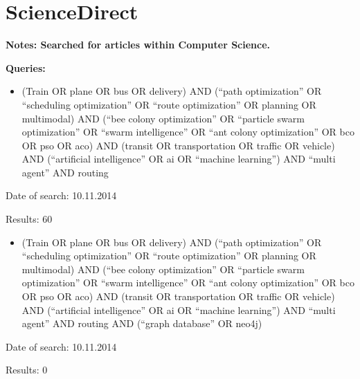 \section{ScienceDirect}
\textbf{Notes: Searched for articles within Computer Science.  }
\par
\textbf{Queries:}
\begin{itemize}
\item (Train OR plane OR bus OR delivery) AND (``path optimization'' OR ``scheduling optimization'' OR ``route optimization'' OR planning OR multimodal) AND (``bee colony optimization'' OR ``particle swarm optimization'' OR ``swarm intelligence'' OR ``ant colony optimization'' OR bco OR pso OR aco) AND (transit OR transportation OR traffic OR vehicle) AND (``artificial intelligence'' OR ai OR ``machine learning'') AND ``multi agent'' AND routing
\end{itemize}
\par Date of search: 10.11.2014
\par Results: 60
\begin{itemize}
\item (Train OR plane OR bus OR delivery) AND (``path optimization'' OR ``scheduling optimization'' OR ``route optimization'' OR planning OR multimodal) AND (``bee colony optimization'' OR ``particle swarm optimization'' OR ``swarm intelligence'' OR ``ant colony optimization'' OR bco OR pso OR aco) AND (transit OR transportation OR traffic OR vehicle) AND (``artificial intelligence'' OR ai OR ``machine learning'') AND ``multi agent'' AND routing AND (``graph database'' OR neo4j)
\end{itemize}
\par Date of search: 10.11.2014
\par Results: 0


